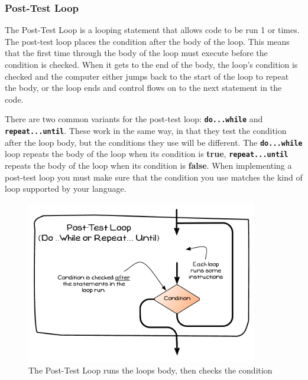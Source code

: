\clearpage
\subsubsection{Post-Test Loop} %
\label{sub:post_test_loop}

The Post-Test Loop is a looping statement that allows code to be run 1 or times. The post-test loop places the condition after the body of the loop. This means that the first time through the body of the loop must execute before the condition is checked. When it gets to the end of the body, the loop's condition is checked and the computer either jumps back to the start of the loop to repeat the body, or the loop ends and control flows on to the next statement in the code.

There are two common variants for the post-test loop: \texttt{\textbf{do...while}} and \texttt{\textbf{repeat...until}}. These work in the same way, in that they test the condition after the loop body, but the conditions they use will be different. The \textbf{\texttt{do...while}} loop repeats the body of the loop when its condition is \textbf{true}, \textbf{\texttt{repeat...until}} repeats the body of the loop when its condition is \textbf{false}. When implementing a post-test loop you must make sure that the condition you use matches the kind of loop supported by your language.

\begin{figure}[h]
   \centering
   \includegraphics[width=0.9\textwidth]{./topics/control-flow/diagrams/PostTestLoop} 
   \caption{The Post-Test Loop runs the loops body, then checks the condition}
   \label{fig:looping-post-test}
\end{figure}



